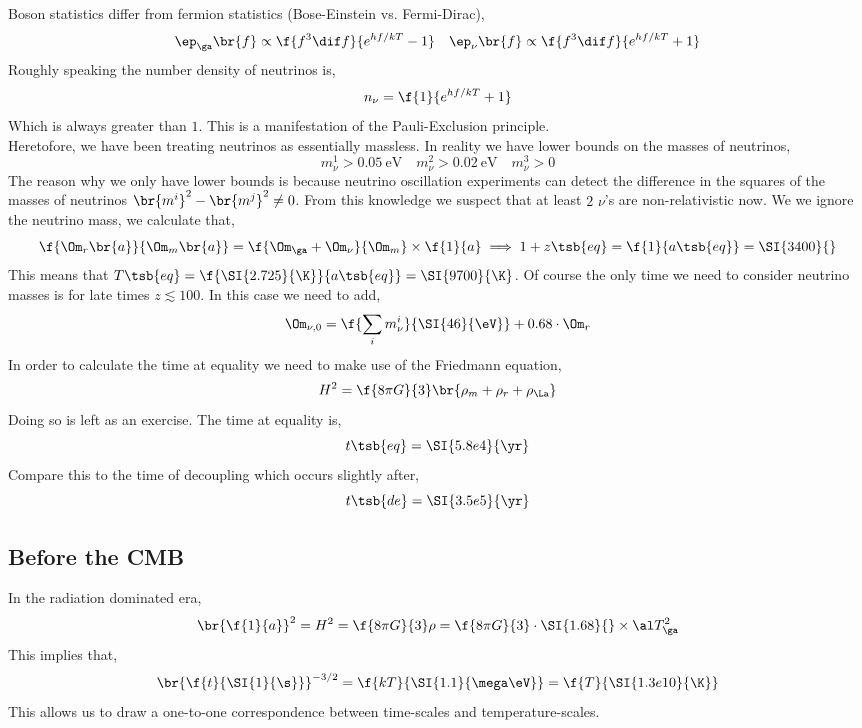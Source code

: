 \documentclass{article}
\begin{document}
Boson statistics differ from fermion statistics (Bose-Einstein vs. Fermi-Dirac),
\[ \ep_\ga\br{f} \propto \f{f^3 \dif f}{e^{hf/kT} - 1} \quad \ep_\nu\br{f} \propto \f{f^3 \dif f}{e^{hf/kT} + 1} \]
Roughly speaking the number density of neutrinos is,
\[ n_\nu = \f{1}{e^{h f/kT} + 1} \]
Which is always greater than $1$. This is a manifestation of the Pauli-Exclusion principle. \\

Heretofore, we have been treating neutrinos as essentially massless. In reality we have lower bounds on the masses of neutrinos,
\[ m_\nu^1 > \SI{0.05}{\eV} \quad m_\nu^2 > \SI{0.02}{\eV} \quad m_\nu^3 > 0 \]
The reason why we only have lower bounds is because neutrino oscillation experiments can detect the difference in the squares of the masses of neutrinos $\br{m^i}^2 - \br{m^j}^2 \neq 0$. From this knowledge we suspect that at least $2$ $\nu$'s are non-relativistic now. We we ignore the neutrino mass, we calculate that,
\[ \f{\Om_r\br{a}}{\Om_m\br{a}} = \f{\Om_\ga + \Om_\nu}{\Om_m} \times \f{1}{a} \implies 1 + z\tsb{eq} = \f{1}{a\tsb{eq}} = \SI{3400}{} \]
This means that $T\tsb{eq} = \f{\SI{2.725}{\K}}{a\tsb{eq}} = \SI{9700}{\K}$. Of course the only time we need to consider neutrino masses is for late times $z \lesssim 100$. In this case we need to add,
\[ \Om_{\nu, 0} = \f{\sum_i m_\nu^i}{\SI{46}{\eV}} + 0.68 \cdot \Om_{r} \]
In order to calculate the time at equality we need to make use of the Friedmann equation,
\[ H^2 = \f{8\pi G}{3}\br{\rho_m + \rho_r + \rho_\La} \]
Doing so is left as an exercise. The time at equality is,
\[ t\tsb{eq} = \SI{5.8e4}{\yr} \]
Compare this to the time of decoupling which occurs slightly after,
\[ t\tsb{de} = \SI{3.5e5}{\yr} \]


\subsection{Before the CMB}
In the radiation dominated era,
\[ \br{\f{1}{a}}^2 = H^2 = \f{8 \pi G}{3} \rho = \f{8 \pi G}{3} \cdot \SI{1.68}{} \times \al T_\ga^2 \]
This implies that,
\[ \br{\f{t}{\SI{1}{\s}}}^{-3/2} = \f{k T}{\SI{1.1}{\mega \eV}} = \f{T}{\SI{1.3e10}{\K}}  \]
This allows us to draw a one-to-one correspondence between time-scales and temperature-scales.
\end{document}
